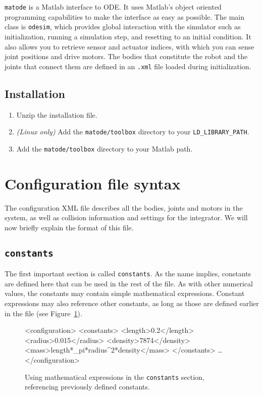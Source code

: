 \documentclass{article}
\newcommand{\txt}[1]{\texttt{#1}}
\newcommand{\matode}{\txt{matode}\xspace}
\newcommand{\tab}{\hspace{3em}}
\newcommand{\xt}[1]{\textcolor{matlab-keyword}{<#1>}}
\newenvironment{code}{\alltt\small}{\endalltt}
\newenvironment{boxedcode}{\begin{boxedminipage}{\linewidth}\begin{code}}{\end{code}\end{boxedminipage}}
\begin{document}
\matode is a Matlab interface to ODE. It uses Matlab's object oriented programming capabilities to make the interface as easy as possible. The main class is \txt{odesim}, which provides global interaction with the simulator such as initialization, running a simulation step, and resetting to an initial condition. It also allows you to retrieve sensor and actuator indices, with which you can sense joint positions and drive motors. The bodies that constitute the robot and the joints that connect them are defined in an \txt{.xml} file loaded during initialization.

\subsection{Installation}
\begin{enumerate}
  \item Unzip the installation file.
  \item \emph{(Linux only)} Add the \txt{matode/toolbox} directory to your \txt{LD\_LIBRARY\_PATH}.
  \item Add the \txt{matode/toolbox} directory to your Matlab path.
\end{enumerate}

\section{Configuration file syntax}
The configuration XML file describes all the bodies, joints and motors in the system, as well as collision information and settings for the integrator. We will now briefly explain the format of this file.

\subsection{\txt{constants}}
The first important section is called \txt{constants}. As the name implies, constants are defined here that can be used in the rest of the file. As with other numerical values, the constants may contain simple mathematical expressions. Constant expressions may also reference other constants, as long as those are defined earlier in the file (see Figure~\ref{fig:lambda:constants}).

\begin{figure}[h!]
\begin{boxedcode}
\xt{configuration}
\tab\xt{constants}
\tab\tab\xt{length}0.2\xt{/length}
\tab\tab\xt{radius}0.015\xt{/radius}
\tab\tab\xt{density}7874\xt{/density}
\tab\tab\xt{mass}length*_pi*radius^2*density\xt{/mass}
\tab\xt{/constants}
\tab\ldots
\xt{/configuration}
\end{boxedcode}
\caption{Using mathematical expressions in the \txt{constants} section, referencing previously defined constants.}
\label{fig:lambda:constants}
\end{figure}
\end{document}
